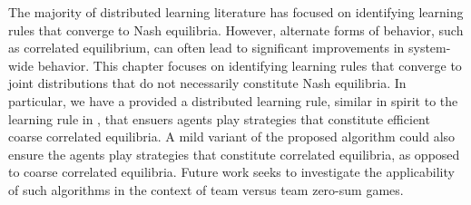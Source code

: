 
The majority of distributed learning literature has focused on identifying learning rules that converge to Nash equilibria.  However, alternate forms of behavior, such as correlated equilibrium, can often lead to significant improvements in system-wide behavior.  This chapter focuses on identifying learning rules that converge to joint distributions that do not necessarily constitute Nash equilibria.  In particular, we have a provided a distributed learning rule, similar in spirit to the learning rule in \cite{Marden2013c}, that ensuers agents play strategies that constitute efficient coarse correlated equilibria. A mild variant of the proposed algorithm could also ensure the agents play strategies that constitute correlated equilibria, as opposed to coarse correlated equilibria.  Future work seeks to investigate the applicability of such algorithms in the context of team versus team zero-sum games.  